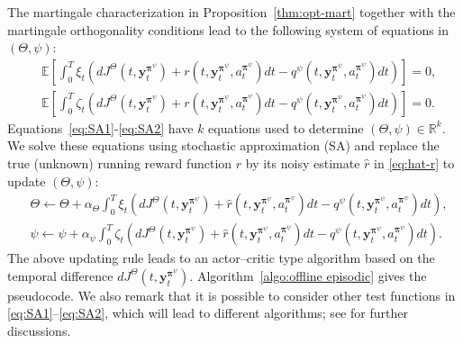 \documentclass[11pt]{article}
\newcommand{\bm}[1]{\boldsymbol{#1}}
\newcommand{\bpi}{\boldsymbol{\pi}}
\begin{document}
The martingale characterization in Proposition~\ref{thm:opt-mart} together with the martingale orthogonality conditions lead to the following system of equations in $(\Theta, \psi)$:
\begin{align}
&\mathbb{E} \left[  \int_0^T  \xi_t     \left( dJ^{\Theta} (t, \mathbf{y}_t^{\bm\pi^{\psi}}) +  r(t, \mathbf{y}_t^{\bpi^{\psi}}, a_t^{\bpi^{\psi}}) dt - q^{\psi}(t, \mathbf{y}_{t}^{\bpi^{\psi}}, a_t^{\bpi^{\psi}}) dt \right)     \right]=0,  \label{eq:SA1}\\
& \mathbb{E} \left[  \int_0^T  \zeta_t     \left( dJ^{\Theta} (t, \mathbf{y}_t^{\bm\pi^{\psi}}) +  r(t, \mathbf{y}_t^{\bpi^{\psi}}, a_t^{\bpi^{\psi}}) dt - q^{\psi}(t, \mathbf{y}_{t}^{\bpi^{\psi}}, a_t^{\bpi^{\psi}}) dt \right)     \right] =0. \label{eq:SA2}
\end{align}
Equations~\eqref{eq:SA1}-\eqref{eq:SA2} have $k$ equations used to determine $(\Theta, \psi) \in \mathbb{R}^k$. %
We solve these equations using stochastic approximation (SA) and replace the true (unknown) running reward function $r$ by its noisy estimate $\hat r$ in \eqref{eq:hat-r} to update $(\Theta, \psi)$:
\begin{align}
& \Theta \leftarrow \Theta + \alpha_{\Theta}    \int_0^T  \xi_t     \left( dJ^{\Theta} (t, \mathbf{y}_t^{\bm\pi^{\psi}}) +  \hat r(t, \mathbf{y}_t^{\bpi^{\psi}}, a_t^{\bpi^{\psi}}) dt - q^{\psi}(t, \mathbf{y}_{t}^{\bpi^{\psi}}, a_t^{\bpi^{\psi}}) dt \right)     ,  \label{eq:SA-update1}\\
& \psi \leftarrow \psi + \alpha_{\psi}  \int_0^T  \zeta_t     \left( dJ^{\Theta} (t, \mathbf{y}_t^{\bm\pi^{\psi}}) +  \hat r(t, \mathbf{y}_t^{\bpi^{\psi}}, a_t^{\bpi^{\psi}}) dt - q^{\psi}(t, \mathbf{y}_{t}^{\bpi^{\psi}}, a_t^{\bpi^{\psi}}) dt \right)    . \label{eq:SA-update2}
\end{align}
The above updating rule leads to an actor--critic type algorithm based on the temporal difference $dJ^{\Theta} (t, \mathbf{y}_t^{\bm\pi^{\psi}})$.  Algorithm~\ref{algo:offline episodic} gives the pseudocode. We also remark that it is possible to consider other test functions in \eqref{eq:SA1}--\eqref{eq:SA2}, which will lead to different algorithms; see \cite{JZ21,jia2023q} for further discussions.
\end{document}
